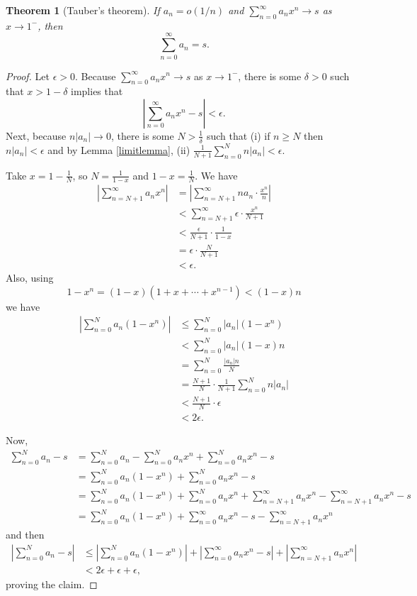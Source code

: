\documentclass{article}
\newtheorem{theorem}{Theorem}
\begin{document}
\begin{theorem}[Tauber's theorem]
If $a_n = o(1/n)$ and $\sum_{n=0}^\infty a_n x^n \to s$ as $x \to 1^-$, then 
\[
\sum_{n=0}^\infty a_n = s.
\]
\end{theorem}
\begin{proof}
Let $\epsilon>0$. 
Because $\sum_{n=0}^\infty a_n x^n \to s$ as $x \to 1^-$, there is some $\delta>0$ such that
$x>1-\delta$ implies that
\[
\left| \sum_{n=0}^\infty a_n x^n-s\right|<\epsilon.
\]
Next,
because $n|a_n| \to 0$,
there is some $N>\frac{1}{\delta}$ such that  (i) if $n \geq N$ then $n|a_n|<\epsilon$ and by Lemma \ref{limitlemma},
 (ii) 
$\frac{1}{N+1}  \sum_{n=0}^N n |a_n|  < \epsilon$.
 

Take $x=1-\frac{1}{N}$, so  $N=\frac{1}{1-x}$ and
$1-x = \frac{1}{N}$.
We have
\begin{align*}
\left| \sum_{n=N+1}^\infty a_n x^n \right| & = \left| \sum_{n=N+1}^\infty na_n \cdot \frac{x^n}{n} \right| \\
&< \sum_{n=N+1}^\infty \epsilon \cdot \frac{x^n}{N+1}\\
&< \frac{\epsilon}{N+1} \cdot \frac{1}{1-x}\\
&=\epsilon \cdot \frac{N}{N+1}\\
&<\epsilon.
\end{align*}
Also, using
\[
1-x^n = (1-x)(1+x+\cdots+x^{n-1}) < (1-x)n
\]
we have
\begin{align*}
\left| \sum_{n=0}^N a_n (1-x^n) \right|&\leq \sum_{n=0}^N |a_n| (1-x^n)\\
&< \sum_{n=0}^N |a_n| (1-x)n\\
&= \sum_{n=0}^N \frac{|a_n|n}{N}\\
&=\frac{N+1}{N} \cdot \frac{1}{N+1} \sum_{n=0}^N n|a_n|\\
&<\frac{N+1}{N} \cdot \epsilon\\
&<2\epsilon.
\end{align*}

Now,
\begin{align*}
\sum_{n=0}^N a_n - s&=\sum_{n=0}^N a_n - \sum_{n=0}^N a_n x^n + \sum_{n=0}^N a_nx^n - s\\
&=\sum_{n=0}^N a_n (1-x^n) + \sum_{n=0}^N a_nx^n -s\\
&=\sum_{n=0}^N a_n(1-x^n) + \sum_{n=0}^N a_nx^n + \sum_{n=N+1}^\infty a_nx^n
-\sum_{n=N+1}^\infty a_nx^n -s\\
&=\sum_{n=0}^N a_n(1-x^n) + \sum_{n=0}^\infty a_n x^n - s - \sum_{n=N+1}^\infty a_nx^n
\end{align*}
and then
\begin{align*}
\left|\sum_{n=0}^N a_n - s\right| &\leq \left| \sum_{n=0}^N a_n(1-x^n) \right|
+\left| \sum_{n=0}^\infty a_n x^n - s \right| + \left| \sum_{n=N+1}^\infty a_nx^n \right|\\
&< 2 \epsilon + \epsilon +  \epsilon,
\end{align*}
proving the claim.
\end{proof}
\end{document}
